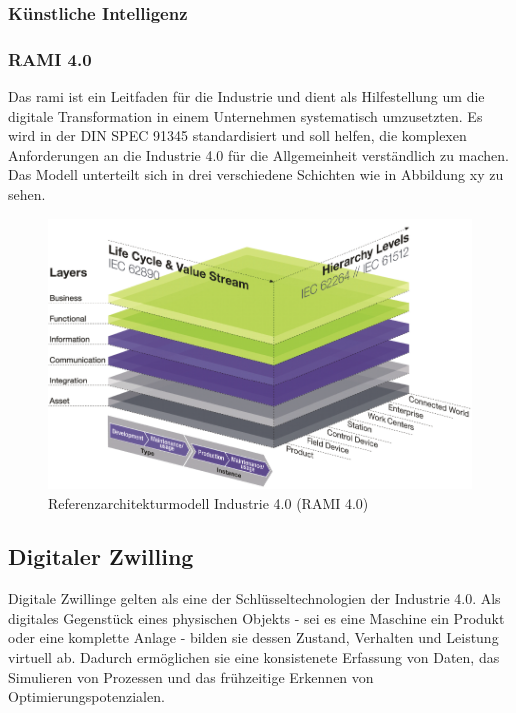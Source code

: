 \subsubsection{Künstliche Intelligenz}
\subsubsection{RAMI 4.0}
Das \ac{rami} ist ein Leitfaden für die Industrie und dient als Hilfestellung um die digitale Transformation in einem Unternehmen systematisch umzusetzten.
Es wird in der DIN SPEC 91345 \cite{RAMI4.0} standardisiert und soll helfen, die komplexen Anforderungen an die Industrie 4.0 für die Allgemeinheit verständlich zu machen.
Das Modell unterteilt sich in drei verschiedene Schichten wie in Abbildung xy zu sehen.

\begin{figure}[htbp]
    \centering
    \includegraphics[width=1\textwidth]{Bilder/RAMI.PNG}
    \caption{Referenzarchitekturmodell Industrie 4.0 (RAMI 4.0)}
    \label{fig:klassifizierungDT}
\end{figure}

\newpage
\subsection{Digitaler Zwilling}
Digitale Zwillinge gelten als eine der Schlüsseltechnologien der Industrie 4.0.
Als digitales Gegenstück eines physischen Objekts - sei es eine Maschine ein Produkt oder eine komplette Anlage - bilden sie dessen Zustand, Verhalten und Leistung virtuell ab.
Dadurch ermöglichen sie eine konsistenete Erfassung von Daten, das Simulieren von Prozessen und das frühzeitige Erkennen von Optimierungspotenzialen.


